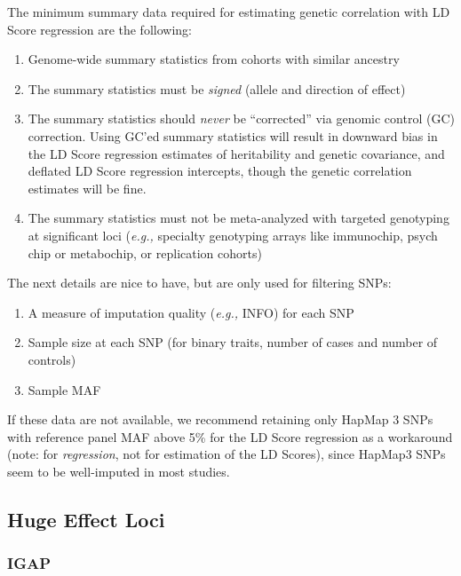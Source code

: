 \documentclass[11pt]{article}
\numberwithin{equation}{section}
\begin{document}
The minimum summary data required for estimating genetic correlation with LD Score regression are the following:
\begin{enumerate}
	\item Genome-wide summary statistics from cohorts with similar ancestry
	\item The summary statistics must be \emph{signed} (allele and direction of effect)
	\item The summary statistics should \emph{never} be ``corrected'' via genomic control (GC) correction. Using GC'ed
		summary statistics will result in downward bias in the LD Score regression estimates of heritability and
		genetic covariance, and deflated LD Score regression intercepts, though the genetic correlation estimates will be fine.
	\item The summary statistics must not be meta-analyzed with targeted genotyping at significant loci 
		(\emph{e.g.,} specialty genotyping arrays like immunochip, psych chip or metabochip, or replication cohorts) 
\end{enumerate}
The next details are nice to have, but are only used for filtering SNPs:
\begin{enumerate}
	\item A measure of imputation quality (\emph{e.g.,} INFO) for each SNP
	\item Sample size at each SNP (for binary traits, number of cases and number of controls)
	\item Sample MAF
\end{enumerate}
If these data are not available, we recommend retaining only HapMap 3 SNPs with reference panel MAF above 5\% for the LD Score regression as a workaround
(note: for \emph{regression}, not for estimation of the LD Scores), 
since HapMap3 SNPs seem to be well-imputed in most studies.

\subsection{Huge Effect Loci}



\subsubsection{IGAP}
\end{document}
